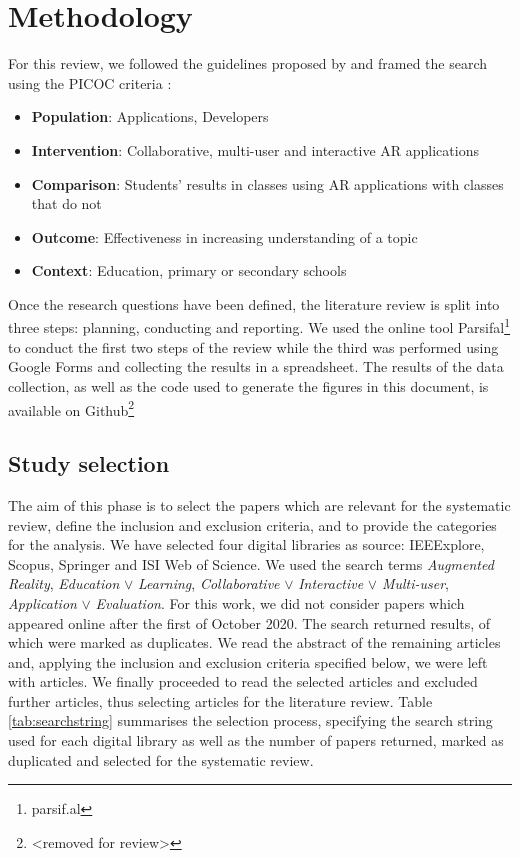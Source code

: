
\section{Methodology}\label{sec:methods}
For this review, we followed the guidelines proposed by \citet{kitchenham2009systematic} and framed the search using the PICOC criteria \citep{petticrew2008systematic}:
\begin{itemize}
    \item \textbf{Population}: Applications, Developers
    \item \textbf{Intervention}: Collaborative, multi-user and interactive \gls{AR} applications
    \item \textbf{Comparison}: Students' results in classes using AR applications with classes that do not
    \item \textbf{Outcome}: Effectiveness in increasing understanding of a topic
    \item \textbf{Context}: Education, primary or secondary schools
\end{itemize}

Once the research questions have been defined, the literature review is split into three steps: planning, conducting and reporting. We used the online tool Parsifal\footnote{parsif.al} to conduct the first two steps of the review while the third was performed using Google Forms and collecting the results in a spreadsheet. The results of the data collection, as well as the code used to generate the figures in this document, is available on Github\footnote{\textless removed for review\textgreater}

\subsection{Study selection}
The aim of this phase is to select the papers which are relevant for the systematic review, define the inclusion and exclusion criteria, and to provide the categories for the analysis.
We have selected four digital libraries as source: IEEExplore, Scopus, Springer and ISI Web of Science. We used the search terms \emph{Augmented Reality}, \emph{Education} $\lor$ \emph{Learning}, \emph{Collaborative} $\lor$ \emph{Interactive} $\lor$ \emph{Multi-user}, \emph{Application} $\lor$ \emph{Evaluation}. For this work, we did not consider papers which appeared online after the first of October 2020. The search returned \allPapers results, of which \duplPapers were marked as duplicates. We read the abstract of the remaining \papersCheckAbstract articles and, applying the inclusion and exclusion criteria specified below, we were left with \papersToRead articles. We finally proceeded to read the selected articles and excluded \papersExludedAfterReading further articles, thus selecting \papersSelected articles for the literature review.
Table \ref{tab:searchstring} summarises the selection process, specifying the search string used for each digital library as well as the number of papers returned, marked as duplicated and selected for the systematic review.

